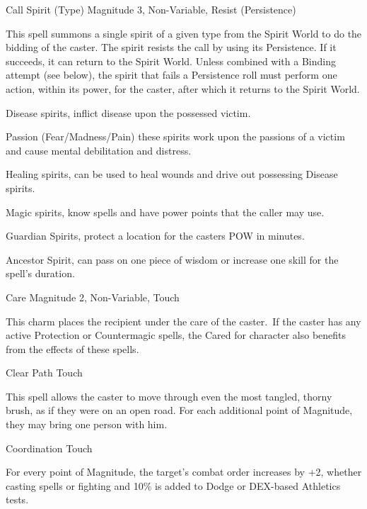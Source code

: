 \begin{rpg-spell}
{Call Spirit (Type)}
{Magnitude 3, Non-Variable, Resist (Persistence)}

This spell summons a single spirit of a given type from the Spirit World to do the bidding of the caster. The spirit resists the call by using its Persistence. If it succeeds, it can return to the Spirit World. Unless combined with a Binding attempt (see below), the spirit that fails a Persistence roll must perform one action, within its power, for the caster, after which it returns to the Spirit World.

\begin{rpg-list}
\item Disease spirits, inflict disease upon the possessed victim.
\item Passion (Fear/Madness/Pain) these spirits work upon the passions of a victim and cause mental debilitation and distress.
\item Healing spirits, can be used to heal wounds and drive out possessing Disease spirits.
\item Magic spirits, know spells and have power points that the caller may use.
\item Guardian Spirits, protect a location for the casters POW in minutes.
\item Ancestor Spirit, can pass on one piece of wisdom or increase one skill for the spell's duration.
\end{rpg-list}
\end{rpg-spell}

 
\begin{rpg-spell}
{Care}
{Magnitude 2, Non-Variable, Touch}

This charm places the recipient under the care of the caster. If the caster has any active Protection or Countermagic spells, the Cared for character also benefits from the effects of these spells.
\end{rpg-spell}

\begin{rpg-spell}
{Clear Path}
{Touch}

This spell allows the caster to move through even the most tangled, thorny brush, as if they were on an open road. For each additional point of Magnitude, they may bring one person with him. 
\end{rpg-spell}


\begin{rpg-spell}
{Coordination}
{Touch}

For every point of Magnitude, the target’s combat order increases by +2, whether casting spells or fighting and 10\% is added to Dodge or DEX-based Athletics tests. 
\end{rpg-spell}



